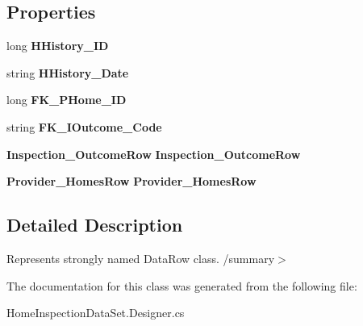 \subsection*{Properties}
\begin{DoxyCompactItemize}
\item 
\mbox{\label{class_a_f_h___scheduler_1_1_home_inspection_data_set_1_1_home___history_row_a183433b5e974fac3bfeeb296801d24f5}} 
long {\bfseries H\+History\+\_\+\+ID}\hspace{0.3cm}{\ttfamily  [get, set]}
\item 
\mbox{\label{class_a_f_h___scheduler_1_1_home_inspection_data_set_1_1_home___history_row_a52a3105aaf4b069d245bf06a4a217d6f}} 
string {\bfseries H\+History\+\_\+\+Date}\hspace{0.3cm}{\ttfamily  [get, set]}
\item 
\mbox{\label{class_a_f_h___scheduler_1_1_home_inspection_data_set_1_1_home___history_row_a2bc918cb1e5d28f978f3cb9b93b4de8c}} 
long {\bfseries F\+K\+\_\+\+P\+Home\+\_\+\+ID}\hspace{0.3cm}{\ttfamily  [get, set]}
\item 
\mbox{\label{class_a_f_h___scheduler_1_1_home_inspection_data_set_1_1_home___history_row_a5283744e6cf9781bdb0f3f361993a1f8}} 
string {\bfseries F\+K\+\_\+\+I\+Outcome\+\_\+\+Code}\hspace{0.3cm}{\ttfamily  [get, set]}
\item 
\mbox{\label{class_a_f_h___scheduler_1_1_home_inspection_data_set_1_1_home___history_row_aae2012260566907b11b69940c18d8bfc}} 
\textbf{ Inspection\+\_\+\+Outcome\+Row} {\bfseries Inspection\+\_\+\+Outcome\+Row}\hspace{0.3cm}{\ttfamily  [get, set]}
\item 
\mbox{\label{class_a_f_h___scheduler_1_1_home_inspection_data_set_1_1_home___history_row_a3bcf96bcb5106e2c22df0a41e51264cc}} 
\textbf{ Provider\+\_\+\+Homes\+Row} {\bfseries Provider\+\_\+\+Homes\+Row}\hspace{0.3cm}{\ttfamily  [get, set]}
\end{DoxyCompactItemize}


\subsection{Detailed Description}
Represents strongly named Data\+Row class. /summary$>$ 

The documentation for this class was generated from the following file\+:\begin{DoxyCompactItemize}
\item 
Home\+Inspection\+Data\+Set.\+Designer.\+cs\end{DoxyCompactItemize}
